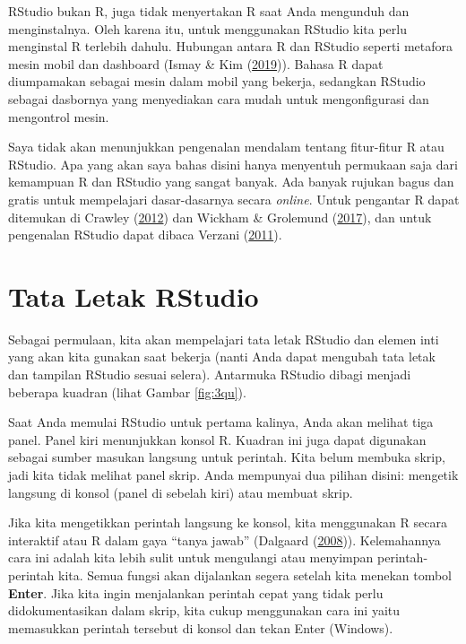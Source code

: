 \documentclass[a4paper, nobind]{templates/ociamthesis}
\begin{document}
RStudio bukan R, juga tidak menyertakan R saat Anda mengunduh dan menginstalnya. Oleh karena itu, untuk menggunakan RStudio kita perlu menginstal R terlebih dahulu. Hubungan antara R dan RStudio seperti metafora mesin mobil dan dashboard (Ismay \& Kim (\protect\hyperlink{ref-ismayStatisticalInferenceData2019}{2019})). Bahasa R dapat diumpamakan sebagai mesin dalam mobil yang bekerja, sedangkan RStudio sebagai dasbornya yang menyediakan cara mudah untuk mengonfigurasi dan mengontrol mesin.

Saya tidak akan menunjukkan pengenalan mendalam tentang fitur-fitur R atau RStudio. Apa yang akan saya bahas disini hanya menyentuh permukaan saja dari kemampuan R dan RStudio yang sangat banyak. Ada banyak rujukan bagus dan gratis untuk mempelajari dasar-dasarnya secara \emph{online}. Untuk pengantar R dapat ditemukan di Crawley (\protect\hyperlink{ref-crawleyBook2012}{2012}) dan Wickham \& Grolemund (\protect\hyperlink{ref-wickhamDataScience2017}{2017}), dan untuk pengenalan RStudio dapat dibaca Verzani (\protect\hyperlink{ref-verzaniGettingStartedRStudio2011}{2011}).

\hypertarget{tata-letak-rstudio}{%
\section{Tata Letak RStudio}\label{tata-letak-rstudio}}

Sebagai permulaan, kita akan mempelajari tata letak RStudio dan elemen inti yang akan kita gunakan saat bekerja (nanti Anda dapat mengubah tata letak dan tampilan RStudio sesuai selera). Antarmuka RStudio dibagi menjadi beberapa kuadran (lihat Gambar \ref{fig:3qu}).

Saat Anda memulai RStudio untuk pertama kalinya, Anda akan melihat tiga panel. Panel kiri menunjukkan konsol R. Kuadran ini juga dapat digunakan sebagai sumber masukan langsung untuk perintah. Kita belum membuka skrip, jadi kita tidak melihat panel skrip. Anda mempunyai dua pilihan disini: mengetik langsung di konsol (panel di sebelah kiri) atau membuat skrip.

Jika kita mengetikkan perintah langsung ke konsol, kita menggunakan R secara interaktif atau R dalam gaya ``tanya jawab'' (Dalgaard (\protect\hyperlink{ref-dalgaardIntroductoryStatistics2008}{2008})). Kelemahannya cara ini adalah kita lebih sulit untuk mengulangi atau menyimpan perintah-perintah kita. Semua fungsi akan dijalankan segera setelah kita menekan tombol \textbf{Enter}. Jika kita ingin menjalankan perintah cepat yang tidak perlu didokumentasikan dalam skrip, kita cukup menggunakan cara ini yaitu memasukkan perintah tersebut di konsol dan tekan Enter (Windows).
\end{document}
